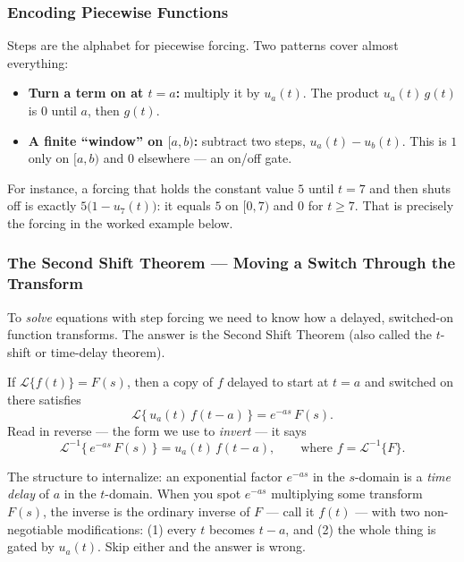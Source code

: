 \documentclass[11pt]{article}
\begin{document}
\subsubsection*{Encoding Piecewise Functions}

Steps are the alphabet for piecewise forcing. Two patterns cover almost everything:

\begin{itemize}[leftmargin=*, itemsep=3pt]
  \item \textbf{Turn a term on at $t = a$:} multiply it by $u_a(t)$. The product $u_a(t)\,g(t)$ is $0$ until $a$, then $g(t)$.
  \item \textbf{A finite ``window'' on $[a,b)$:} subtract two steps, $u_a(t) - u_b(t)$. This is $1$ only on $[a,b)$ and $0$ elsewhere --- an on/off gate.
\end{itemize}

For instance, a forcing that holds the constant value $5$ until $t = 7$ and then shuts off is exactly $5\big(1 - u_7(t)\big)$: it equals $5$ on $[0,7)$ and $0$ for $t \ge 7$. That is precisely the forcing in the worked example below.

\subsubsection*{The Second Shift Theorem --- Moving a Switch Through the Transform}

To \emph{solve} equations with step forcing we need to know how a delayed, switched-on function transforms. The answer is the Second Shift Theorem (also called the $t$-shift or time-delay theorem).

\begin{formulabox}
If $\mathcal{L}\{f(t)\} = F(s)$, then a copy of $f$ delayed to start at $t = a$ and switched on there satisfies
\[ \mathcal{L}\big\{\,u_a(t)\,f(t-a)\,\big\} = e^{-as}\,F(s). \]
Read in reverse --- the form we use to \emph{invert} --- it says
\[ \mathcal{L}^{-1}\big\{\,e^{-as}\,F(s)\,\big\} = u_a(t)\,f(t-a), \qquad\text{where } f = \mathcal{L}^{-1}\{F\}. \]
\end{formulabox}

The structure to internalize: an exponential factor $e^{-as}$ in the $s$-domain is a \emph{time delay} of $a$ in the $t$-domain. When you spot $e^{-as}$ multiplying some transform $F(s)$, the inverse is the ordinary inverse of $F$ --- call it $f(t)$ --- with two non-negotiable modifications: (1) every $t$ becomes $t - a$, and (2) the whole thing is gated by $u_a(t)$. Skip either and the answer is wrong.
\end{document}
